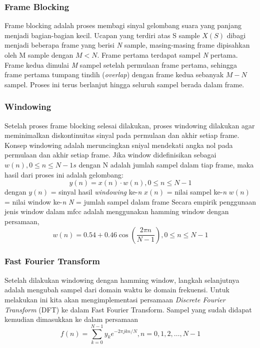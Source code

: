 \subsubsection{Frame Blocking}
Frame blocking adalah proses membagi sinyal gelombang suara yang panjang menjadi bagian-bagian kecil. Ucapan yang terdiri atas S sample $ X(S) $ dibagi menjadi beberapa frame yang berisi \textit{N} sample, masing-masing frame dipisahkan oleh M sample dengan $ M < N $. Frame pertama terdapat sampel \textit{N} pertama. Frame kedua dimulai \textit{M} sampel setelah permulaan frame pertama, sehingga frame pertama tumpang tindih (\textit{overlap}) dengan frame kedua sebanyak $ M-N $ sampel. Proses ini terus berlanjut hingga seluruh sampel berada dalam frame.
\subsubsection{Windowing}
Setelah proses frame blocking selesai dilakukan, proses windowing dilakukan agar meminimalkan diskontinuitas sinyal pada permulaan dan akhir setiap frame. Konsep windowing adalah meruncingkan sniyal mendekati angka nol pada permulaan dan akhir setiap frame. Jika window didefinisikan sebagai $ w(n), 0 \leq n \leq N-1s$ dengan N adalah jumlah sampel dalam tiap frame, maka hasil dari proses ini adalah gelombang:
\begin{equation}
y(n) = x(n) \cdot w(n), 0 \leq n \leq N -1
\end{equation}
dengan $y(n)$ = sinyal hasil \textit{windowing} ke-\textit{n}
$x(n)$ = nilai sampel ke-\textit{n}
$w(n)$ = nilai window ke-\textit{n}
\textit{N} = jumlah sampel dalam frame
Secara empirik penggunaan jenis window dalam mfcc adalah menggunakan hamming window dengan persamaan,
\begin{equation}
w(n) = 0.54 + 0.46 \cos \left( \frac{2\pi n}{N - 1} \right), 0 \leq n \leq N -1
\end{equation}

\subsubsection{Fast Fourier Transform}
Setelah dilakukan windowing dengan hamming window, langkah selanjutnya adalah mengubah sampel dari domain waktu ke domain frekuensi. Untuk melakukan ini kita akan mengimplementasi persamaan \textit{Discrete Fourier Transform} (DFT) ke dalam Fast Fourier Transform. Sampel yang sudah didapat kemudian dimasukkan ke dalam persamaan
\begin{equation}
f(n) =\sum_{k=0}^{N-1} y_{k} e^{-2\pi jkn / N}, n = 0,1,2, \ldots ,N-1
\end{equation}
